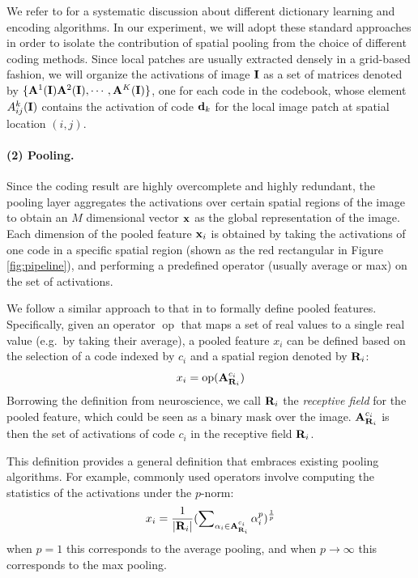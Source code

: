 We refer to \cite{Coates:2011ud} for a systematic discussion about different dictionary learning and encoding algorithms. In our experiment, we will adopt these standard approaches in order to isolate  the contribution of spatial pooling from the choice of different coding methods. Since local patches are usually extracted densely in a grid-based fashion, we will organize the activations of image $\mathbf{I}$ as a set of matrices denoted by $\{\mathbf{A}^{1}(\mathbf{I})\mathbf{A}^{2}(\mathbf{I}),\cdots,\mathbf{A}^{K}(\mathbf{I})\}$, one for each code in the codebook, whose element $A_{ij}^k(\mathbf{I})$ contains the activation of code $\mathbf{d}_k$ for the local image patch at spatial location $(i,j)$. 

\paragraph{(2) Pooling.} Since the coding result are highly overcomplete and highly redundant, the pooling layer aggregates the activations over certain spatial regions of the image to obtain an $M$ dimensional vector $\mathbf{x}$ as the global representation of the image. Each dimension of the pooled feature $\mathbf{x}_i$ is obtained by taking the activations of one code in a specific spatial region (shown as the red rectangular in Figure \ref{fig:pipeline}), and performing a predefined operator (usually average or max) on the set of activations. 

We follow a similar approach to that in \cite{Boureau:2011tz} to formally define pooled features. Specifically, given an operator $\operatorname{op}$ that maps a set of real values to a single real value (e.g.\ by taking their average), a pooled feature $x_i$ can be defined based on the selection of a code indexed by $c_i$ and a spatial region denoted by $\mathbf{R}_{i}$:
\begin{equation}
  x_i = \operatorname{op} (\mathbf{A}^{c_i}_{\mathbf{R}_{i}})
\end{equation}
Borrowing the definition from neuroscience, we call $\mathbf{R}_i$ the \emph{receptive field} for the pooled feature, which could be seen as a binary mask over the image. $\mathbf{A}^{c_i}_{\mathbf{R}_{i}}$ is then the set of activations of code $c_i$ in the receptive field $\mathbf{R}_i$.

This definition provides a general definition that embraces existing pooling algorithms. For example, commonly used operators involve computing the statistics of the activations under the $p$-norm:
\begin{equation}
  x_i = \frac{1}{|\mathbf{R}_{i}|}(\sum\nolimits_{\alpha_i \in \mathbf{A}^{c_i}_{\mathbf{R}_{i}}} \alpha_i^{p})^{\frac{1}{p}}
\end{equation}
when $p=1$ this corresponds to the average pooling, and when $p\rightarrow \infty$ this corresponds to the max pooling.

